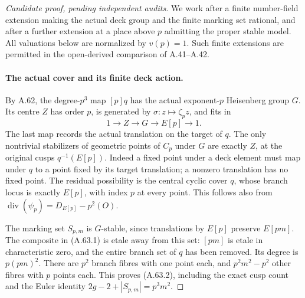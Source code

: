 \begin{proof}[Candidate proof, pending independent audits]
We work after a finite number-field extension making the
actual deck group and the finite marking set rational, and
after a further extension at a place above \(p\) admitting
the proper stable model. All valuations below are normalized
by \(v(p)=1\). Such finite extensions are permitted in the
open-derived comparison of A.41--A.42.

\paragraph{The actual cover and its finite deck action.}
By A.62, the degree-\(p^3\) map \([p]q\) has the actual
exponent-\(p\) Heisenberg group \(G\). Its centre \(Z\)
has order \(p\), is generated by
\(\sigma:z\mapsto\zeta_pz\), and fits in
\[
 1\longrightarrow Z\longrightarrow G
       \longrightarrow E[p]\longrightarrow1.
                                                        \tag{A.63.3}
\]
The last map records the actual translation on the target of
\(q\). The only nontrivial stabilizers of geometric points
of \(C_p\) under \(G\) are exactly \(Z\), at the original
cusps \(q^{-1}(E[p])\). Indeed a fixed point under a deck
element must map under \(q\) to a point fixed by its target
translation; a nonzero translation has no fixed point.
The residual possibility is the central cyclic cover \(q\),
whose branch locus is exactly \(E[p]\), with index \(p\)
at every point. This follows also from
\(\operatorname{div}(\psi_p)=D_{E[p]}-p^2(O)\).

The marking set \(S_{p,m}\) is \(G\)-stable, since
translations by \(E[p]\) preserve \(E[pm]\).
The composite in (A.63.1) is etale away from this set:
\([pm]\) is etale in characteristic zero, and the entire
branch set of \(q\) has been removed. Its degree is
\(p(pm)^2\). There are \(p^2\) branch fibres with one
point each, and \(p^2m^2-p^2\) other fibres with \(p\)
points each. This proves (A.63.2), including the exact cusp
count and the Euler identity \(2g-2+|S_{p,m}|=p^3m^2\).


\end{proof}
